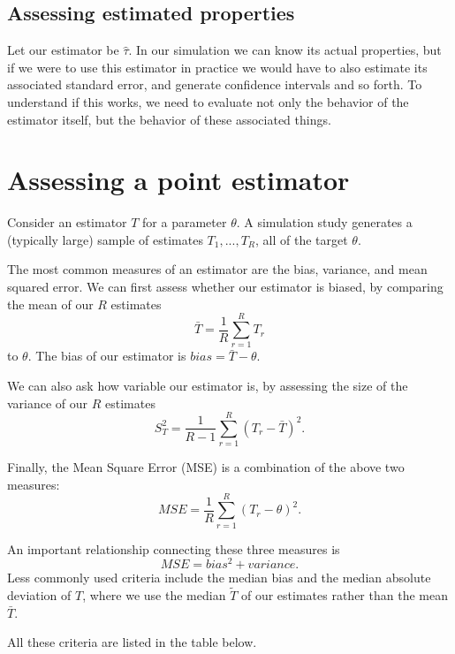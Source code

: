 \documentclass[
]{book}
\begin{document}
\hypertarget{assessing-estimated-properties}{%
\subsection{Assessing estimated properties}\label{assessing-estimated-properties}}

Let our estimator be \(\hat{\tau}\). In our simulation we can know its actual properties, but if we were to use this estimator in practice we would have to also estimate its associated standard error, and generate confidence intervals and so forth.
To understand if this works, we need to evaluate not only the behavior of the estimator itself, but the behavior of these associated things.

\hypertarget{assessing-a-point-estimator}{%
\section{Assessing a point estimator}\label{assessing-a-point-estimator}}

Consider an estimator \(T\) for a parameter \(\theta\).
A simulation study generates a (typically large) sample of estimates \(T_1,...,T_R\), all of the target \(\theta\).

The most common measures of an estimator are the bias, variance, and mean squared error.
We can first assess whether our estimator is biased, by comparing the mean of our \(R\) estimates
\[ \bar{T} = \frac{1}{R}\sum_{r=1}^R T_r \]
to \(\theta\).
The bias of our estimator is \(bias = \bar{T} - \theta\).

We can also ask how variable our estimator is, by assessing the size of the variance of our \(R\) estimates
\[\displaystyle{S_T^2 = \frac{1}{R - 1}\sum_{r=1}^R \left(T_r - \bar{T}\right)^2} . \]

Finally, the Mean Square Error (MSE) is a combination of the above two measures:
\[ MSE = \frac{1}{R} \sum_{r = 1}^R \left( T_r - \theta\right)^2 . \]

An important relationship connecting these three measures is
\[ MSE = bias^2 + variance .\]
Less commonly used criteria include the median bias and the median absolute deviation of \(T\), where we use the median \(\tilde{T}\) of our estimates rather than the mean \(\bar{T}\).

All these criteria are listed in the table below.
\end{document}
